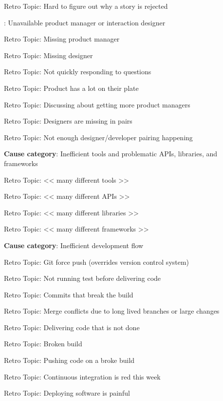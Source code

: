 \quad \quad \quad \quad Retro Topic: Hard to figure out why a story is rejected

\quad \quad {}: Unavailable product manager or interaction designer

\quad \quad \quad \quad Retro Topic: Missing product manager

\quad \quad \quad \quad Retro Topic: Missing designer

\quad \quad \quad \quad Retro Topic: Not quickly responding to questions

\quad \quad \quad \quad Retro Topic: Product has a lot on their plate

\quad \quad \quad \quad Retro Topic: Discussing about getting more product managers

\quad \quad \quad \quad Retro Topic: Designers are missing in pairs

\quad \quad \quad \quad Retro Topic: Not enough designer/developer pairing happening

\quad \quad \textbf{Cause category}: Inefficient tools and problematic APIs, libraries, and frameworks

\quad \quad \quad Retro Topic: << many different tools >>

\quad \quad \quad Retro Topic: << many different APIs >>

\quad \quad \quad Retro Topic: << many different libraries >>

\quad \quad \quad Retro Topic: << many different frameworks >>

\quad \quad \textbf{Cause category}: Inefficient development flow

\quad \quad \quad Retro Topic: Git force push (overrides version control system)

\quad \quad \quad Retro Topic: Not running test before delivering code

\quad \quad \quad Retro Topic: Commits that break the build

\quad \quad \quad Retro Topic: Merge conflicts due to long lived branches or large changes

\quad \quad \quad Retro Topic: Delivering code that is not done

\quad \quad \quad Retro Topic: Broken build

\quad \quad \quad Retro Topic: Pushing code on a broke build

\quad \quad \quad Retro Topic: Continuous integration is red this week

\quad \quad \quad Retro Topic: Deploying software is painful

